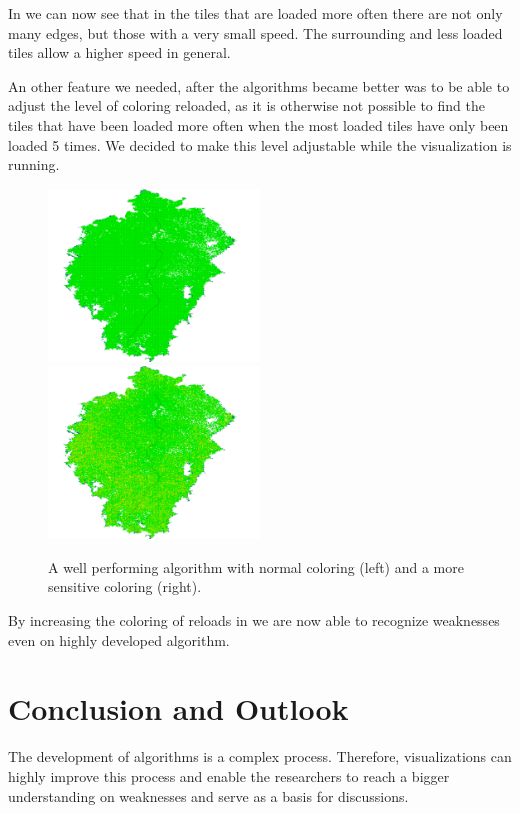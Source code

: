 \documentclass
[
    paper = a4,
    pagesize,
    12 pt,
    oneside,                       %
    open = right,
    DIV = calc,
    BCOR = 0 mm,                   %
    bibtotoc
]
{scrbook}
\begin{document}
In  we can now see that in the tiles that are loaded more often there are not only many edges, but those with a very small speed.
The surrounding and less loaded tiles allow a higher speed in general.

An other feature we needed, after the algorithms became better was to be able to adjust the level of coloring reloaded, as it is otherwise not possible to find the tiles that have been loaded more often when the most loaded tiles have only been loaded 5 times.
We decided to make this level adjustable while the visualization is running.

\begin{figure}
    \includegraphics[width=0.5\textwidth]{Images/vis-no-factor.png}
  \includegraphics[width=0.5\textwidth]{Images/vis-factor.png}
\caption[]{A well performing algorithm with normal coloring (left) and a more sensitive coloring (right).}
\label{fig:factor}
\end{figure}

By increasing the coloring of reloads in  we are now able to recognize weaknesses even on highly developed algorithm.

\chapter{Conclusion and Outlook}

The development of algorithms is a complex process.
Therefore, visualizations can highly improve this process and enable the researchers to reach a bigger understanding on weaknesses and serve as a basis for discussions.
\end{document}
